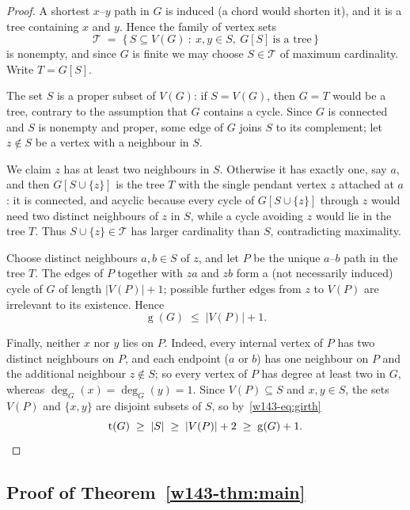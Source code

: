 \documentclass[11pt]{article}
\numberwithin{equation}{section}
\theoremstyle{remark}
\newcommand{\tr}{\operatorname{t}}
\newcommand{\gr}{\operatorname{g}}
\begin{document}
\begin{proof}
A shortest $x$--$y$ path in $G$ is induced (a chord would shorten it), and it
is a tree containing $x$ and $y$.  Hence the family of vertex sets
\[
  \mathcal{T}\;=\;\{\,S\subseteq V(G)\ :\ x,y\in S,\ G[S]\ \text{is a tree}\,\}
\]
is nonempty, and since $G$ is finite we may choose $S\in\mathcal{T}$ of
maximum cardinality.  Write $T=G[S]$.

The set $S$ is a proper subset of $V(G)$: if $S=V(G)$, then $G=T$ would be a
tree, contrary to the assumption that $G$ contains a cycle.  Since $G$ is
connected and $S$ is nonempty and proper, some edge of $G$ joins $S$ to its
complement; let $z\notin S$ be a vertex with a neighbour in $S$.

We claim $z$ has at least two neighbours in $S$.  Otherwise it has exactly
one, say $a$, and then $G[S\cup\{z\}]$ is the tree $T$ with the single pendant
vertex $z$ attached at $a$: it is connected, and acyclic because every cycle
of $G[S\cup\{z\}]$ through $z$ would need two distinct neighbours of $z$ in
$S$, while a cycle avoiding $z$ would lie in the tree $T$.  Thus
$S\cup\{z\}\in\mathcal{T}$ has larger cardinality than $S$, contradicting
maximality.

Choose distinct neighbours $a,b\in S$ of $z$, and let $P$ be the unique
$a$--$b$ path in the tree $T$.  The edges of $P$ together with $za$ and $zb$
form a (not necessarily induced) cycle of $G$ of length $|V(P)|+1$; possible
further edges from $z$ to $V(P)$ are irrelevant to its existence.  Hence
\begin{equation}\label{w143-eq:girth}
  \gr(G)\;\le\;|V(P)|+1 .
\end{equation}

Finally, neither $x$ nor $y$ lies on $P$.  Indeed, every internal vertex of
$P$ has two distinct neighbours on $P$, and each endpoint ($a$ or $b$) has one
neighbour on $P$ and the additional neighbour $z\notin S$; so every vertex of
$P$ has degree at least two in $G$, whereas $\deg_G(x)=\deg_G(y)=1$.  Since
$V(P)\subseteq S$ and $x,y\in S$, the sets $V(P)$ and $\{x,y\}$ are disjoint
subsets of $S$, so by~\eqref{w143-eq:girth}
\[
  \tr(G)\;\ge\;|S|\;\ge\;|V(P)|+2\;\ge\;\gr(G)+1 . \qedhere
\]
\end{proof}

\subsection{Proof of Theorem~\ref{w143-thm:main}}
\end{document}
